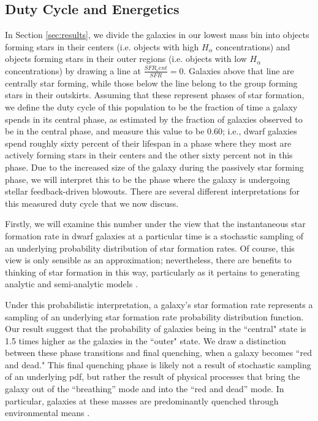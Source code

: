 \documentclass[iop]{emulateapj}
\begin{document}
\subsection{Duty Cycle and Energetics}

In Section \ref{sec:results}, we divide the galaxies in our lowest mass bin into objects forming stars in their centers (i.e. objects with high $H_{\alpha}$ concentrations) and objects forming stars in their outer regions (i.e. objects with low $H_{\alpha}$ concentrations) by drawing a line at $\frac{SFR_cent}{SFR} = 0$. Galaxies above that line are centrally star forming, while those below the line belong to the group forming stars in their outskirts. Assuming that these represent phases of star formation, we define the duty cycle of this population to be the fraction of time a galaxy spends in its central phase, as estimated by the fraction of galaxies observed to be in the central phase, and measure this value to be 0.60; i.e., dwarf galaxies spend roughly sixty percent of their lifespan in a phase where they most are actively forming stars in their centers and the other sixty percent not in this phase. Due to the increased size of the galaxy during the passively star forming phase, we will interpret this to be the phase where the galaxy is undergoing stellar feedback-driven blowouts. There are several different interpretations for this measured duty cycle that we now discuss.

Firstly, we will examine this number under the view that the instantaneous star formation rate in dwarf galaxies at a particular time is a stochastic sampling of an underlying probability distribution of star formation rates. Of course, this view is only sensible as an approximation; nevertheless, there are benefits to thinking of star formation in this way, particularly as it pertains to generating analytic and semi-analytic models \citep{Kelson16}. 

Under this probabilistic interpretation, a galaxy's star formation rate represents a sampling of an underlying star formation rate probability distribution function. Our result suggest that the probability of galaxies being in the ``central" state is 1.5 times higher as the galaxies in the ``outer" state. We draw a distinction between these phase transitions and final quenching, when a galaxy becomes ``red and dead." This final quenching phase is likely not a result of stochastic sampling of an underlying pdf, but rather the result of physical processes that bring the galaxy out of the ``breathing'' mode and into the ``red and dead'' mode. In particular, galaxies at these masses are predominantly quenched through environmental means \citep{Kauffmann03, geha12}.
\end{document}
